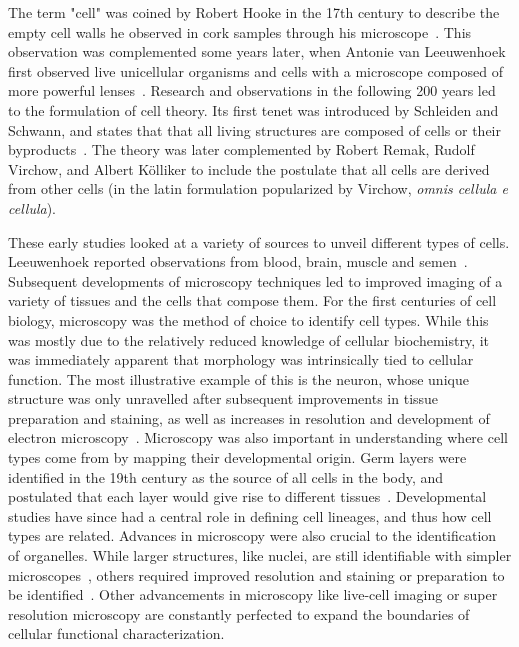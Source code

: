 The term "cell" was coined by Robert Hooke in the 17th century to describe the empty cell walls he observed in cork samples through his microscope~\citep{hooke_micrographia:_1667}. This observation was complemented some years later, when Antonie van Leeuwenhoek first observed live unicellular organisms and cells with a microscope composed of more powerful lenses~\citep{mazzarello_unifying_1999}. Research and observations in the following 200 years led to the formulation of cell theory. Its first tenet was introduced by Schleiden and Schwann, and states that that all living structures are composed of cells or their byproducts~\citep{schwann_microscopical_1847}. The theory was later complemented by Robert Remak, Rudolf Virchow, and Albert Kölliker to include the postulate that all cells are derived from other cells (in the latin formulation popularized by Virchow, \textit{omnis cellula e cellula}).

These early studies looked at a variety of sources to unveil different types of cells. Leeuwenhoek reported observations from blood, brain, muscle and semen~\citep{leeuwenhoeck_m_microscopical_1674,leeuwenhoek_antoni_van_observationes_1677}. Subsequent developments of microscopy techniques led to improved imaging of a variety of tissues and the cells that compose them. For the first centuries of cell biology, microscopy was the method of choice to identify cell types. While this was mostly due to the relatively reduced knowledge of cellular biochemistry, it was immediately apparent that morphology was intrinsically tied to cellular function. The most illustrative example of this is the neuron, whose unique structure was only unravelled after subsequent improvements in tissue preparation and staining, as well as increases in resolution and development of electron microscopy~\citep{mazzarello_unifying_1999}. Microscopy was also important in understanding where cell types come from by mapping their developmental origin. Germ layers were identified in the 19th century as the source of all cells in the body, and postulated that each layer would give rise to different tissues~\citep{collins_terminology_1995}. Developmental studies have since had a central role in defining cell lineages, and thus how cell types are related. Advances in microscopy were also crucial to the identification of organelles. While larger structures, like nuclei, are still identifiable with simpler microscopes~\citep{brown_organs_1866}, others required improved resolution and staining or preparation to be identified~\citep{golgi_structure_1989}. Other advancements in microscopy like live-cell imaging or super resolution microscopy are constantly perfected to expand the boundaries of cellular functional characterization.

